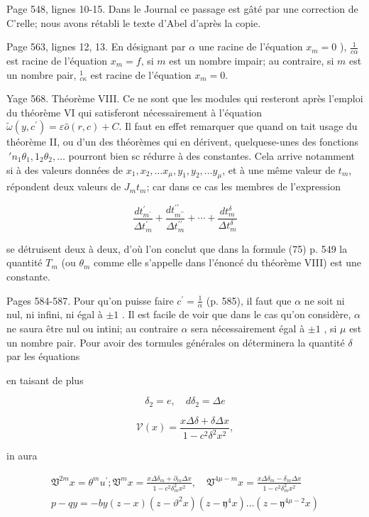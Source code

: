 \documentclass{article}
\begin{document}
Page 548, lignes 10-15. Dans le Journal ce passage est gâté par une correction de C'relle; nous avons rétabli le texte d'Abel d'après la copie.

Page 563, lignes 12, 13. En désignant par \(\alpha\) une racine de l'équation \(x_{m}=0\) ), \(\frac{1}{c \alpha}\) est racine de l'équation \(x_{m}=f\), si \(m\) est un nombre impair; au contraire, si \(m\) est un nombre pair, \({ }_{c \kappa}^{1}\) est racine de l'équation \(x_{m}=0\).

Yage 568. Théorème VIII. Ce ne sont que les modules qui resteront après l'emploi du théorème VI qui satisferont nécessairement à l'équation \(\tilde{\omega}\left(y, c^{\prime}\right)=\varepsilon \hat{o}(r, c)+C\). Il faut en effet remarquer que quand on tait usage du théorème II, ou d'un des théorèmes qui en dérivent, quelquese-unes des fonctions \(~ \prime n_{1} \theta_{1}, 1_{2} \theta_{2}, \ldots\) pourront bien sc rédurre à des constantes. Cela arrive notamment si à des valeurs données de \(x_{1}, x_{2}, \ldots x_{\mu}, y_{1}, y_{2}, \ldots y_{\mu}\), et à une même valeur de \(t_{m}\), répondent deux valeurs de \(J_{m} t_{m}\); car dans ce cas les membres de l'expression

\[
\frac{d t_{m^{\prime}}^{\prime}}{\Delta t_{m}^{\prime}}+\frac{d t_{m^{\prime \prime}}^{\prime \prime}}{\Delta t_{m}^{\prime \prime}}+\cdots+\frac{d t_{m}^{\delta}}{\Delta t_{m}^{\delta}}
\]

se détruisent deux à deux, d'où l'on conclut que dans la formule (75) p. 549 la quantité \(T_{m}\) (ou \(\theta_{m}\) comme elle s'appelle dans l'énoncé du théorème VIII) est une constante.

Pages 584-587. Pour qu'on puisse faire \(c^{\prime}=\frac{1}{\alpha}\) (p. 585), il faut que \(\alpha\) ne soit ni nul, ni infini, ni égal à \(\pm 1\) . Il est facile de voir que dans le cas qu'on considère, \(\alpha\)
ne saura être nul ou intini; au contraire \(\alpha\) sera nécessairement égal à \(\pm 1\) , si \(\mu\) est un nombre pair. Pour avoir des tormules générales on déterminera la quantité \(\delta\) par les équations

en taisant de plus

\[
\delta_{2}=e, \quad d \delta_{2}=\Delta e
\]

\[
\mathcal{V}(x)=\frac{x \Delta \delta+\delta \Delta x}{1-c^{2} \delta^{2} x^{2}},
\]

in aura

\[
\begin{gathered}
\mathfrak{V}^{2 m} x=\theta^{m} u^{\prime} ; \mathfrak{V}^{m} x=\frac{x \Delta \delta_{m}+\partial_{m} \Delta x}{1-c^{2} \delta_{m}^{2} x^{2}}, \quad \mathfrak{V}^{4 \mu-m} x=\frac{x \Delta \delta_{m}-\delta_{m} \Delta x}{1-c^{2} \delta_{m}^{2} x^{2}} \\
p-q y=-b y(z-x)\left(z-\vartheta^{2} x\right)\left(z-\mathfrak{y}^{4} x\right) \ldots\left(z-\mathfrak{y}^{4 \mu-2} x\right)
\end{gathered}
\]
\end{document}
